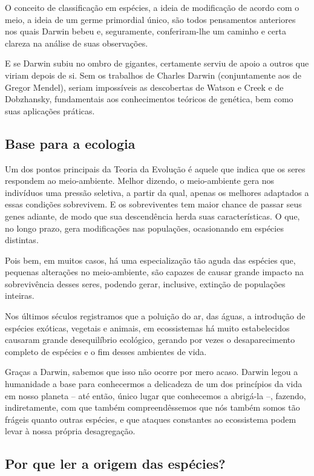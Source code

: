\documentclass[12pt]{extarticle}
\begin{document}
O conceito de classificação em espécies, a ideia de modificação de acordo com
o meio, a ideia de um germe primordial único, são todos pensamentos anteriores
nos quais Darwin bebeu e, seguramente, conferiram-lhe um caminho e certa
clareza na análise de suas observações.

E se Darwin subiu no ombro de gigantes, certamente serviu de apoio a outros que
viriam depois de si. Sem os trabalhos de Charles Darwin (conjuntamente aos de
Gregor Mendel), seriam impossíveis as descobertas de Watson e Creek e de
Dobzhansky, fundamentais aos conhecimentos teóricos de genética, bem como suas
aplicações práticas.

\subsection{Base para a ecologia}

Um dos pontos principais da Teoria da Evolução é aquele que indica que os seres
respondem ao meio-ambiente. Melhor dizendo, o meio-ambiente gera nos indivíduos
uma pressão seletiva, a partir da qual, apenas os melhores adaptados a essas
condições sobrevivem. E os sobreviventes tem maior chance de passar seus genes
adiante, de modo que sua descendência herda suas características. O que, no
longo prazo, gera modificações nas populações, ocasionando em espécies
distintas.

Pois bem, em muitos casos, há uma especialização tão aguda das espécies que,
pequenas alterações no meio-ambiente, são capazes de causar grande impacto na
sobrevivência desses seres, podendo gerar, inclusive, extinção de populações
inteiras.

Nos últimos séculos registramos que a poluição do ar, das águas, a introdução
de espécies exóticas, vegetais e animais, em ecossistemas há muito
estabelecidos causaram grande desequilíbrio ecológico, gerando por vezes
o desaparecimento completo de espécies e o fim desses ambientes de vida.

Graças a Darwin, sabemos que isso não ocorre por mero acaso. Darwin legou
a humanidade a base para conhecermos a delicadeza de um dos princípios da vida
em nosso planeta -- até então, único lugar que conhecemos a abrigá-la --,
fazendo, indiretamente, com que também compreendêssemos que nós também somos
tão frágeis quanto outras espécies, e que ataques constantes ao ecossistema
podem levar à nossa própria desagregação.

\subsection{Por que ler a origem das espécies?}
\end{document}
